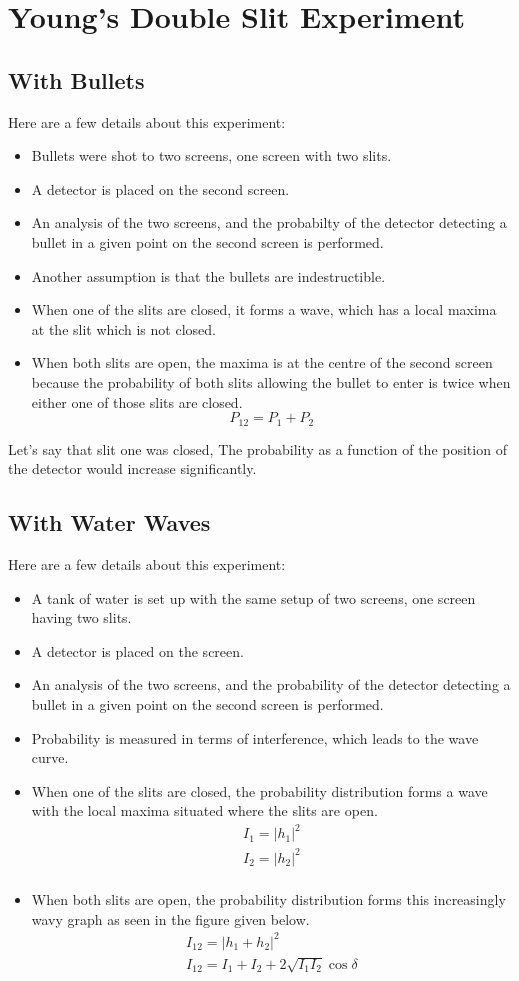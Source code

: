 \documentclass{report}
\begin{document}
\section{Young's Double Slit Experiment}
\subsection{With Bullets}
Here are a few details about this experiment:

\begin{itemize}
	\item Bullets were shot to two screens, one screen with two slits.
	\item A detector is placed on the second screen.
	\item An analysis of the two screens, and the probabilty of the detector detecting a bullet in a given point on the second screen is performed.
	\item Another assumption is that the bullets are indestructible.
	\item When one of the slits are closed, it forms a wave, which has a local maxima at the slit which is not closed.
	\item When both slits are open, the maxima is at the centre of the second screen because the probability of both slits allowing the bullet to enter is twice when either one of those slits are closed.
		\[
			P_{12} = P_1 + P_2
		\]
\end{itemize}

Let's say that slit one was closed, The probability as a function of the position of the detector would increase significantly. 
\subsection{With Water Waves}
Here are a few details about this experiment:
\begin{itemize}
	\item A tank of water is set up with the same setup of two screens, one screen having two slits.
	\item A detector is placed on the screen.
	\item An analysis of the two screens, and the probability of the detector detecting a bullet in a given point on the second screen is performed.
	\item Probability is measured in terms of interference, which leads to the wave curve.
	\item When one of the slits are closed, the probability distribution forms a wave with the local maxima situated where the slits are open.
		\begin{align*}
			I_1 = |h_1|^2  \\
			I_2 = |h_2|^2 \\
		\end{align*}
	\item When both slits are open, the probability distribution forms this increasingly wavy graph as seen in the figure given below.
		\begin{align*}
			I_{12} = |h_1 + h_2|^2 \\
			I_{12} = I_1 + I_2 + 2 \sqrt{I_1I_2}\cos{\delta}
		\end{align*}
\end{itemize}
\end{document}
